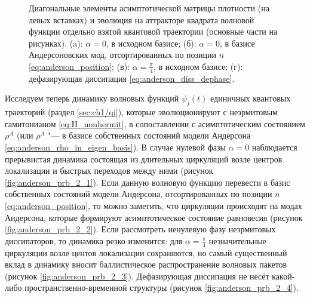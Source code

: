 \begin{figure}[ht]
	\legend{}
	\caption[Динамика квантовых траекторий на квантовых аттракторах в зависимости от параметров неэрмитовой диссипации]
	{
		Диагональные элементы асимптотической матрицы плотности (на левых вставках) и эволюция на аттракторе квадрата волновой функции отдельно взятой квантовой траектории (основные части на рисунках). (a): \(\alpha = 0\), в исходном базисе; (б): \(\alpha = 0\), в базисе Андерсоновских мод, отсортированных по позиции \(n\) \cref{eq:anderson_position}; (в): \(\alpha=\frac{\pi}{4}\), в исходном базисе; (г): дефазирующая диссипация \cref{eq:anderson_diss_dephase}. 
	}
	\label{fig:anderson_prb_2}
\end{figure}

Исследуем теперь динамику волновых функций \(\psi_j(t)\) единичных квантовых траекторий (раздел \cref{sec:ch1/qj}), которые эволюционируют с неэрмитовым гамитонианом \cref{eq:H_nonhermit}, в сопоставлении с асимптотическим состоянием \(\rho^A\) (или \(\bar{\rho}^A\) "--- в базисе собственных состояний модели Андерсона \cref{eq:anderson_rho_in_eigen_basis}). 
В случае нулевой фазы \(\alpha=0\) наблюдается прерывистая динамика состоящая из длительных циркуляций возле центров локализации и быстрых переходов между ними (рисунок \cref{fig:anderson_prb_2_1}). 
Если данную волновую функцию перевести в базис собственных состояний модели Андерсона,  отсортированных по позиции \(n\) \cref{eq:anderson_position}, то можно заметить, что циркуляции происходят на модах Андерсона, которые формируют асимптотическое состояние равновесия \cite{Yusipov2017} (рисунок \cref{fig:anderson_prb_2_2}). 
Если рассмотреть ненулевую фазу неэрмитовых диссипаторов, то динамика резко изменится: для \(\alpha=\frac{\pi}{4}\) незначительные циркуляции возле центов локализации сохраняются, но самый существенный вклад в динамику вносит баллистическое распространение волновых пакетов (рисунок \cref{fig:anderson_prb_2_3}). 
Дефазирующая диссипация не несёт какой-либо пространственно-временной структуры (рисунок \cref{fig:anderson_prb_2_4}).

